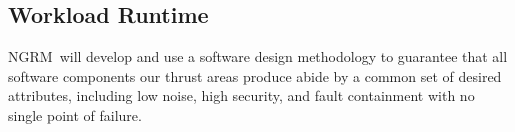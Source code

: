 \documentclass{article}
\newcommand{\ngrm}{NGRM}
\begin{document}
\subsection{Workload Runtime}

\ngrm\ will develop and use a software design methodology to
guarantee that all software components our thrust areas produce
abide by a common set of desired attributes, including low noise,
high security, and fault containment with no single point of failure.













\appendix







\end{document}
